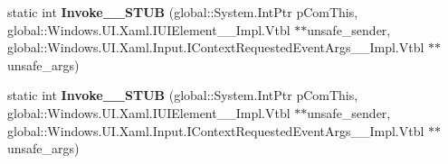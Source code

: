 \begin{DoxyCompactItemize}
static int {\bfseries Invoke\+\_\+\+\_\+\+S\+T\+UB} (global\+::\+System.\+Int\+Ptr p\+Com\+This, global\+::\+Windows.\+U\+I.\+Xaml.\+I\+U\+I\+Element\+\_\+\+\_\+\+Impl.\+Vtbl $\ast$$\ast$unsafe\+\_\+sender, global\+::\+Windows.\+U\+I.\+Xaml.\+Input.\+I\+Context\+Requested\+Event\+Args\+\_\+\+\_\+\+Impl.\+Vtbl $\ast$$\ast$unsafe\+\_\+args)
\item 
\mbox{\label{struct_windows_1_1_foundation_1_1_typed_event_handler___a___windows___u_i___xaml___u_i_element__da1bc19a586bc8852d547ddd669460cf_a32b74f1f5e4eb60f0bbbb45b12d14e67}} 
static int {\bfseries Invoke\+\_\+\+\_\+\+S\+T\+UB} (global\+::\+System.\+Int\+Ptr p\+Com\+This, global\+::\+Windows.\+U\+I.\+Xaml.\+I\+U\+I\+Element\+\_\+\+\_\+\+Impl.\+Vtbl $\ast$$\ast$unsafe\+\_\+sender, global\+::\+Windows.\+U\+I.\+Xaml.\+Input.\+I\+Context\+Requested\+Event\+Args\+\_\+\+\_\+\+Impl.\+Vtbl $\ast$$\ast$unsafe\+\_\+args)
\end{DoxyCompactItemize}
